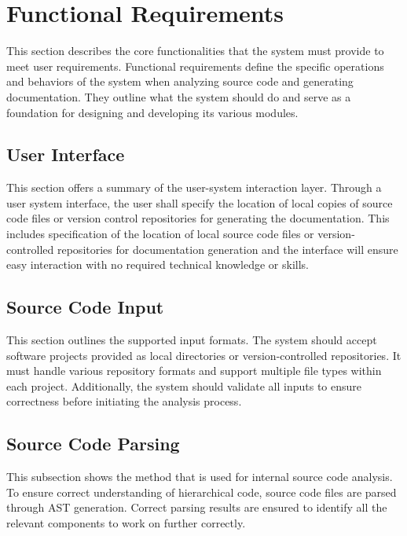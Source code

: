 \section{Functional Requirements}
\hspace{0.5cm}
This section describes the core functionalities that the system must provide to meet user requirements. Functional requirements define the specific operations and behaviors of the system when analyzing source code and generating documentation. They outline what the system should do and serve as a foundation for designing and developing its various modules. 

\subsection{User Interface}
\hspace{0.5cm}
This section offers a summary of the user-system interaction layer. Through a user system interface, the user shall specify the location of local copies of source code files or version control repositories for generating the documentation. This includes specification of the location of local source code files or version-controlled repositories for documentation generation and the interface will ensure easy interaction with no required technical knowledge or skills. 

\subsection{Source Code Input}
\hspace{0.5cm}
This section outlines the supported input formats. The system should accept software projects provided as local directories or version-controlled repositories. It must handle various repository formats and support multiple file types within each project. Additionally, the system should validate all inputs to ensure correctness before initiating the analysis process.

\subsection{Source Code Parsing}
\hspace{0.5cm}
This subsection shows the method that is used for internal source code analysis. To ensure correct understanding of hierarchical code, source code files are parsed through AST generation. Correct parsing results are ensured to identify all the relevant components to work on further correctly. 

